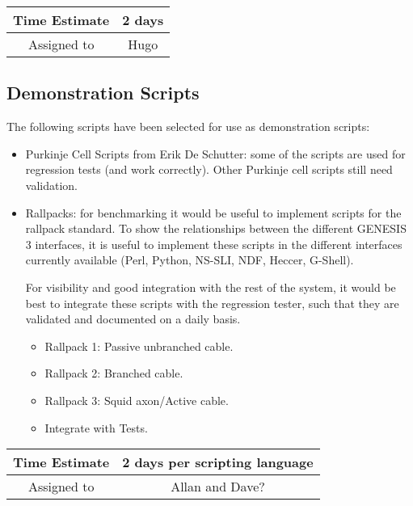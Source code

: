\documentclass[12pt]{article}
\begin{document}
\begin{center}
  \vspace{5mm}
  \centering
  \begin{tabular}{|c|c|}
    \hline
    Time Estimate
    & 2 days \\
    \hline
    Assigned to
    & Hugo \\
    \hline
  \end{tabular}
\end{center}


\subsection{Demonstration Scripts}

The following scripts have been selected for use as demonstration
scripts:

\begin{itemize}
\item Purkinje Cell Scripts from Erik De Schutter: some of the scripts
  are used for regression tests (and work correctly).  Other Purkinje
  cell scripts still need validation.
\item Rallpacks: for benchmarking it would be useful to implement
  scripts for the rallpack standard.  To show the relationships
  between the different GENESIS\,3 interfaces, it is useful to
  implement these scripts in the different interfaces currently
  available (Perl, Python, NS-SLI, NDF, Heccer, G-Shell).

  For visibility and good integration with the rest of the system, it
  would be best to integrate these scripts with the regression tester,
  such that they are validated and documented on a daily basis.
  \begin{itemize}
  \item Rallpack 1: Passive unbranched cable.
  \item Rallpack 2: Branched cable.
  \item Rallpack 3: Squid axon/Active cable.
  \item Integrate with Tests.
  \end{itemize}
\end{itemize}

\begin{center}
  \vspace{5mm}
  \centering
  \begin{tabular}{|c|c|}
    \hline
    Time Estimate
    & 2 days per scripting language \\
    \hline
    Assigned to
    & Allan and Dave? \\
    \hline
  \end{tabular}
\end{center}
\end{document}
